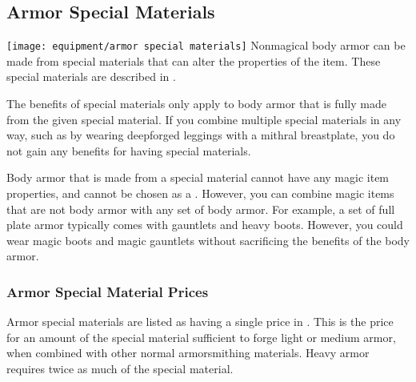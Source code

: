     \subsection{Armor Special Materials}\label{Armor Special Materials}
        \texttt{[image: equipment/armor special materials]}
        Nonmagical body armor can be made from special materials that can alter the properties of the item.
        These special materials are described in .

        The benefits of special materials only apply to body armor that is fully made from the given special material.
        If you combine multiple special materials in any way, such as by wearing deepforged leggings with a mithral breastplate, you do not gain any benefits for having special materials.

        Body armor that is made from a special material cannot have any magic item properties, and cannot be chosen as a .
        However, you can combine magic items that are not body armor with any set of body armor.
        For example, a set of full plate armor typically comes with gauntlets and heavy boots.
        However, you could wear magic boots and magic gauntlets without sacrificing the benefits of the body armor.

        \subsubsection{Armor Special Material Prices}
            Armor special materials are listed as having a single price in .
            This is the price for an amount of the special material sufficient to forge light or medium armor, when combined with other normal armorsmithing materials.
            Heavy armor requires twice as much of the special material.

